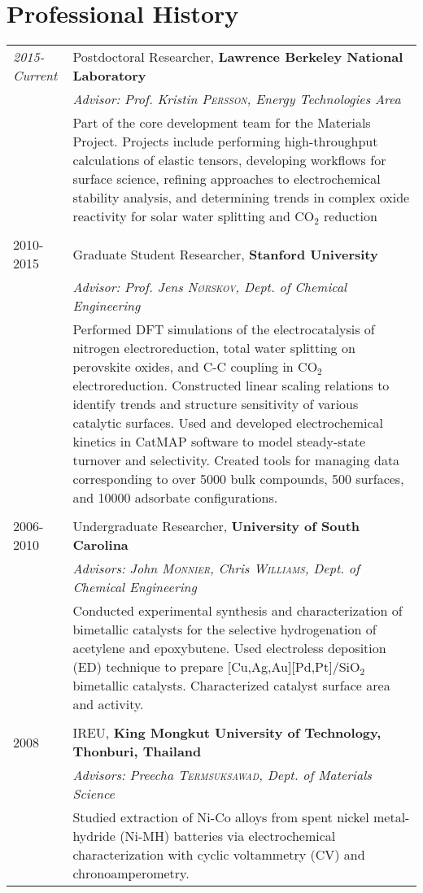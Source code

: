 \documentclass[a4paper,10pt]{article}
\begin{document}
\section{Professional History}
\begin{tabular}{l|p{11cm}}
 \emph{2015-Current} & Postdoctoral Researcher, \textbf{Lawrence Berkeley National Laboratory} \\
 &\emph{Advisor: Prof. Kristin \textsc{Persson}, Energy Technologies Area} \vspace{0.05in}\\& 
 \small{Part of the core development team for the Materials Project.  Projects include performing 
 high-throughput calculations of elastic tensors, developing workflows for surface science, refining approaches 
 to electrochemical stability analysis, and determining trends in complex oxide reactivity for solar water splitting
 and CO$_2$ reduction}\\\multicolumn{2}{c}{} \\
 \textsc{2010-2015} & Graduate Student Researcher, \textbf{Stanford University}\\&\emph{Advisor: Prof. Jens \textsc{N\o rskov}, Dept. of Chemical Engineering} \vspace{0.05in}\\
&\small{Performed DFT simulations of the electrocatalysis of nitrogen electroreduction, total water splitting on perovskite oxides, and C-C coupling in CO$_2$ electroreduction.  Constructed linear scaling relations to identify trends and structure sensitivity of various catalytic surfaces.  Used and developed electrochemical kinetics in CatMAP software to model steady-state turnover and selectivity.  Created tools for managing data corresponding to over 5000 bulk compounds, 500 surfaces, and 10000 adsorbate configurations.}\\\multicolumn{2}{c}{} \\
\textsc{2006-2010} & Undergraduate Researcher, \textbf{University of South Carolina}\\&\emph{Advisors: John \textsc{Monnier}, Chris \textsc{Williams}, Dept. of Chemical Engineering} \vspace{0.05in}\\&\small{Conducted experimental synthesis and characterization of bimetallic catalysts for the selective hydrogenation of acetylene and epoxybutene.  Used electroless deposition (ED) technique to prepare [Cu,Ag,Au][Pd,Pt]/SiO$_2$ bimetallic catalysts.  Characterized catalyst surface area and activity.}\\ \multicolumn{2}{c}{} \\
\textsc{2008} & IREU, \textbf{King Mongkut University of Technology, Thonburi, Thailand}\\&\emph{Advisors: Preecha \textsc{Termsuksawad}, Dept. of Materials Science} \vspace{0.05in}\\&\small{Studied extraction of Ni-Co alloys from spent nickel metal-hydride (Ni-MH) batteries via electrochemical characterization with cyclic voltammetry (CV) and chronoamperometry.}
\end{tabular}
\vspace{0.2in}
\end{document}
